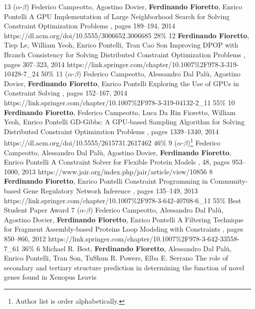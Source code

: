 \begin{pubs}
\confentry 
	{13} %
	{($\alpha$-$\beta$) 
	Federico Campeotto, Agostino Dovier, {\bf Ferdinando Fioretto}, Enrico Pontelli}
	{A GPU Implementation of Large Neighborhood Search for Solving Constraint Optimization Problems} 
	{\procECAI, pages 189--194, 2014}
	{https://dl.acm.org/doi/10.5555/3006652.3006685}
	{28\%}
\confentry
	{12} %
	{{\bf Ferdinando Fioretto}, Tiep Le, William Yeoh, Enrico Pontelli, Tran Cao Son}
	{Improving DPOP with Branch Consistency for Solving Distributed Constraint Optimization Problems}
	{\procCP, pages 307--323, 2014}
	{https://link.springer.com/chapter/10.1007\%2F978-3-319-10428-7\_24}
	{50\%}
\confentry
	{11} %
	{($\alpha$-$\beta$) 
	Federico Campeotto, Alessandro Dal Pal\`{u}, Agostino Dovier, {\bf Ferdinando Fioretto}, Enrico Pontelli}
	{Exploring the Use of GPUs in Constraint Solving}
	{\procPADL, pages 152--167, 2014}
	{https://link.springer.com/chapter/10.1007\%2F978-3-319-04132-2\_11}
	{55\%}
\confentry 
	{10} %
	{{\bf Ferdinando Fioretto}, Federico Campeotto, Luca Da Rin Fioretto, William Yeoh, Enrico Pontelli} 
	{GD-Gibbs: A GPU-based Sampling Algorithm for Solving Distributed Constraint Optimization Problems} %
	{\procAAMAS, pages 1339--1340, 2014}
	{https://dl.acm.org/doi/10.5555/2615731.2617462}
	{46\%}
\journalentry
	{9}	%
	{($\alpha$-$\beta$)\footnote{Author list is order alphabetically.} 
	Federico Campeotto, Alessandro Dal Pal\`{u}, Agostino Dovier,  {\bf Ferdinando Fioretto}, Enrico Pontelli}
	{A Constraint Solver for Flexible Protein Models}
	{\JAIR, 48, pages 953--1000, 2013}
	{https://www.jair.org/index.php/jair/article/view/10856}
\confentryAwd
	{8} %
	{{\bf Ferdinando Fioretto}, Enrico Pontelli} 
	{Constraint Programming in Community-based Gene Regulatory Network Inference} 
	{\procCMSB, pages 135--149, 2013}
	{https://link.springer.com/chapter/10.1007\%2F978-3-642-40708-6\_11}
	{55\%}
	{Best Student Paper Award}{}
\confentry 
	{7} %
	{($\alpha$-$\beta$) 
	Federico Campeotto, Alessandro Dal Pal\`{u}, Agostino Dovier, {\bf Ferdinando Fioretto}, Enrico Pontelli}
	{A Filtering Technique for Fragment Assembly-based Proteins Loop Modeling with Constraints} 
	{\procCP, pages 850--866, 2012}
	{https://link.springer.com/chapter/10.1007\%2F978-3-642-33558-7\_61}
	{36\%}
\confentry
	{6} %
	{Michael R. Best, {\bf Ferdinando Fioretto}, Alessandro Dal Pal\`{u}, Enrico Pontelli, Tran Son, TuShun R. Powers, Elba E. Serrano}
	{The role of secondary and tertiary structure prediction in determining the function of novel genes found in Xenopus Leavis}

\end{pubs}

